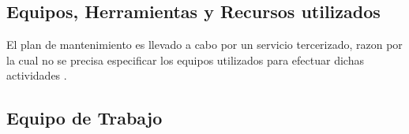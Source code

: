 

\subsection{Equipos, Herramientas y Recursos utilizados}

El plan de mantenimiento es llevado a cabo por un servicio  tercerizado, razon por la cual no se precisa especificar los equipos utilizados para efectuar dichas actividades . 







%
%
%
%





\subsection{Equipo de Trabajo}


